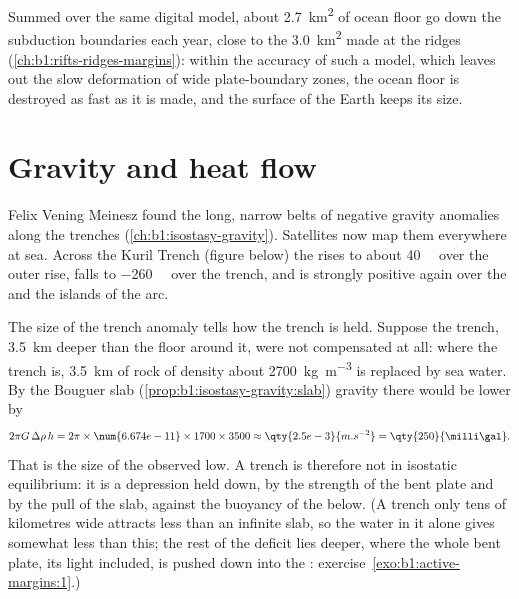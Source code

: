 Summed over the same digital model, about \qty{2.7}{km^2} of ocean floor go
down the subduction boundaries each year, close to the \qty{3.0}{km^2} made at
the ridges (\cref{ch:b1:rifts-ridges-margins}): within the accuracy of such a
model, which leaves out the slow deformation of wide plate-boundary zones, the
ocean floor is destroyed as fast as it is made, and the surface of the Earth
keeps its size.

\section{Gravity and heat flow}\label{sec:b1:active-margins:gravity-heat}

Felix Vening Meinesz found the long, narrow belts of negative gravity anomalies
along the trenches (\cref{ch:b1:isostasy-gravity}). Satellites now map them
everywhere at sea. Across the Kuril Trench (figure below) the 
rises to about \qty{40}{\milli\gal} over the outer rise, falls to
\qty{-260}{\milli\gal} over the trench, and is strongly positive again over the
 and the islands of the arc.

The size of the trench anomaly tells how the trench is held. Suppose the trench,
\qty{3.5}{km} deeper than the floor around it, were not compensated at all:
where the trench is, \qty{3.5}{km} of rock of density about
\qty{2700}{kg.m^{-3}} is replaced by sea water. By the Bouguer slab
(\cref{prop:b1:isostasy-gravity:slab}) gravity there would be lower by
\[
  2\pi G\,\Delta\rho\,h = 2\pi \times \num{6.674e-11} \times 1700 \times 3500
  \approx \qty{2.5e-3}{m.s^{-2}} = \qty{250}{\milli\gal} .
\]
That is the size of the observed low. A trench is therefore not in isostatic
equilibrium: it is a depression held down, by the strength of the bent plate
and by the pull of the slab, against the buoyancy of the  below. (A
trench only tens of kilometres wide attracts less than an infinite slab, so
the water in it alone gives somewhat less than this; the rest of the deficit
lies deeper, where the whole bent plate, its light  included, is pushed
down into the : exercise~\ref{exo:b1:active-margins:1}.)


